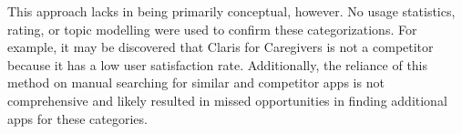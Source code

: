 This approach lacks in being primarily conceptual, however.
No usage statistics, rating, or topic modelling were used to confirm these
    categorizations.
For example, it may be discovered that Claris for Caregivers is not a competitor
    because it has a low user satisfaction rate.
Additionally, the reliance of this method on manual searching for similar and
    competitor apps is not comprehensive and likely resulted in missed
    opportunities in finding additional apps for these categories.
